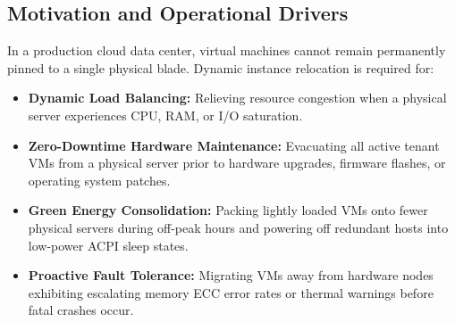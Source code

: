 \documentclass[11pt,a4paper,openany]{report}
\begin{document}
\subsection{Motivation and Operational Drivers}
In a production cloud data center, virtual machines cannot remain permanently pinned to a single physical blade. Dynamic instance relocation is required for:
\begin{itemize}[leftmargin=*]
  \item \textbf{Dynamic Load Balancing:} Relieving resource congestion when a physical server experiences CPU, RAM, or I/O saturation.
  \item \textbf{Zero-Downtime Hardware Maintenance:} Evacuating all active tenant VMs from a physical server prior to hardware upgrades, firmware flashes, or operating system patches.
  \item \textbf{Green Energy Consolidation:} Packing lightly loaded VMs onto fewer physical servers during off-peak hours and powering off redundant hosts into low-power ACPI sleep states.
  \item \textbf{Proactive Fault Tolerance:} Migrating VMs away from hardware nodes exhibiting escalating memory ECC error rates or thermal warnings before fatal crashes occur.
\end{itemize}
\end{document}
